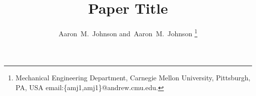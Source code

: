 \documentclass[journal]{IEEEtran}
\newcommand{\FIXME}[1][]{\textcolor{red}{\textbf{FIXME}}\ifthenelse{\equal{#1}{}}{#1}{: \textcolor{grey50}{\emph{#1}}}}
\begin{document}
\title{Paper Title}

\author{Aaron~M.~Johnson %
        and~Aaron~M.~Johnson %
\thanks{Mechanical Engineering Department, Carnegie Mellon University, Pittsburgh, PA, USA email:\{amj1,amj1\}@andrew.cmu.edu.}%
}

\maketitle

\IEEEpeerreviewmaketitle








%
\end{document}
